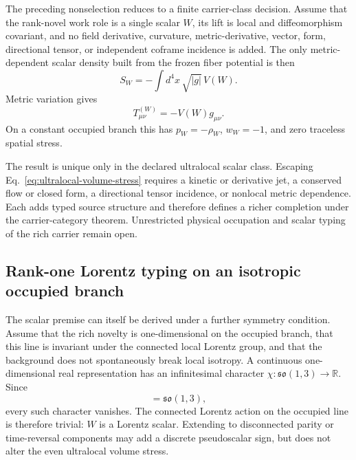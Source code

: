 \documentclass[11pt]{article}
\begin{document}
The preceding nonselection reduces to a finite carrier-class decision. Assume
that the rank-novel work role is a single scalar \(W\), its lift is local and
diffeomorphism covariant, and no field derivative, curvature, metric-derivative,
vector, form, directional tensor, or independent coframe incidence is added. The only metric-dependent
scalar density built from the frozen fiber potential is then
\begin{equation}
 S_W=-\int d^4x\,\sqrt{|g|}\,V(W).
 \label{eq:ultralocal-volume-lift}
\end{equation}
Metric variation gives
\begin{equation}
 T^{(W)}_{\mu\nu}=-V(W)g_{\mu\nu}.
 \label{eq:ultralocal-volume-stress}
\end{equation}
On a constant occupied branch this has \(p_W=-\rho_W\), \(w_W=-1\), and zero
traceless spatial stress.

The result is unique only in the declared ultralocal scalar class. Escaping
Eq.~\eqref{eq:ultralocal-volume-stress} requires a kinetic or derivative jet,
a conserved flow or closed form, a directional tensor incidence, or nonlocal
metric dependence. Each adds typed source structure and therefore defines a
richer completion under the carrier-category theorem. Unrestricted physical occupation
and scalar typing of the rich carrier remain open.

\subsection{Rank-one Lorentz typing on an isotropic occupied branch}

The scalar premise can itself be derived under a further symmetry condition.
Assume that the rich novelty is one-dimensional on the occupied branch, that
this line is invariant under the connected local Lorentz group, and that the
background does not spontaneously break local isotropy. A continuous
one-dimensional real representation has an infinitesimal character
\(\chi:\mathfrak{so}(1,3)\rightarrow\mathbb R\). Since
\begin{equation}
 [\mathfrak{so}(1,3),\mathfrak{so}(1,3)]=\mathfrak{so}(1,3),
 \label{eq:lorentz-perfect}
\end{equation}
every such character vanishes. The connected Lorentz action on the occupied
line is therefore trivial: \(W\) is a Lorentz scalar. Extending to disconnected
parity or time-reversal components may add a discrete pseudoscalar sign, but
does not alter the even ultralocal volume stress.
\end{document}
